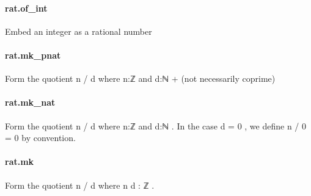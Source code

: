 \documentclass{article}
\begin{document}
\paragraph{rat.of\_int}
\par
Embed an integer as a rational number
\paragraph{rat.mk\_pnat}
\par
Form the quotient 
\colorbox[RGB]{253,246,227}{{{{\color[RGB]{101, 123, 131} n  }}}{{{\color[RGB]{181, 137, 0} / }}}{{{\color[RGB]{101, 123, 131}  d }}}} where 
\colorbox[RGB]{253,246,227}{{{{\color[RGB]{101, 123, 131} n:ℤ }}}} and 
\colorbox[RGB]{253,246,227}{{{{\color[RGB]{101, 123, 131} d:ℕ }}}{{{\color[RGB]{181, 137, 0} + }}}} (not necessarily coprime)
\paragraph{rat.mk\_nat}
\par
Form the quotient 
\colorbox[RGB]{253,246,227}{{{{\color[RGB]{101, 123, 131} n  }}}{{{\color[RGB]{181, 137, 0} / }}}{{{\color[RGB]{101, 123, 131}  d }}}} where 
\colorbox[RGB]{253,246,227}{{{{\color[RGB]{101, 123, 131} n:ℤ }}}} and 
\colorbox[RGB]{253,246,227}{{{{\color[RGB]{101, 123, 131} d:ℕ }}}}. In the case 
\colorbox[RGB]{253,246,227}{{{{\color[RGB]{101, 123, 131} d  }}}{{{\color[RGB]{181, 137, 0} = }}}{{{\color[RGB]{101, 123, 131}   }}}{{{\color[RGB]{108, 113, 196} 0 }}}}, we
define 
\colorbox[RGB]{253,246,227}{{{{\color[RGB]{101, 123, 131} n  }}}{{{\color[RGB]{181, 137, 0} / }}}{{{\color[RGB]{101, 123, 131}   }}}{{{\color[RGB]{108, 113, 196} 0 }}}{{{\color[RGB]{101, 123, 131}   }}}{{{\color[RGB]{181, 137, 0} = }}}{{{\color[RGB]{101, 123, 131}   }}}{{{\color[RGB]{108, 113, 196} 0 }}}} by convention.
\paragraph{rat.mk}
\par
Form the quotient 
\colorbox[RGB]{253,246,227}{{{{\color[RGB]{101, 123, 131} n  }}}{{{\color[RGB]{181, 137, 0} / }}}{{{\color[RGB]{101, 123, 131}  d }}}} where 
\colorbox[RGB]{253,246,227}{{{{\color[RGB]{101, 123, 131} n d : ℤ }}}}.
\end{document}

